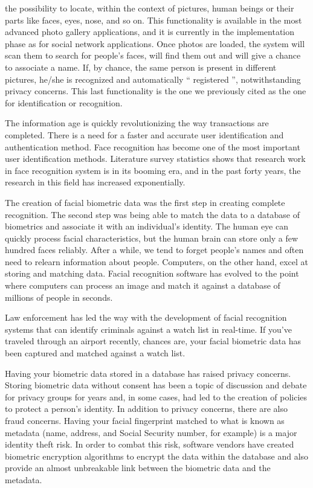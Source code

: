 \documentclass[sigconf]{acmart}
\begin{document}
the possibility to locate, within the context of pictures, human beings or their parts like faces, eyes, nose, and so on. This functionality is available in the most advanced photo gallery applications, and it is currently in the implementation phase as for social network applications. Once photos are loaded, the system will scan them to search for people’s faces, will find them out and will give a chance to associate a name. If, by chance, the same person is present in different pictures, he/she is recognized and automatically “ registered ”, notwithstanding privacy concerns. This last functionality is the one we previously cited as the one for identification or recognition.

The information age is quickly revolutionizing the way transactions are completed. There is a need for a faster and accurate user identification and authentication method. Face recognition has become one of the most important user identification methods. Literature survey statistics shows that research work in face recognition system is in its booming era, and in the past forty years, the research in this field has increased exponentially. ~\cite{arduino2015}

The creation of facial biometric data was the first step in creating complete recognition. The second step was being able to match the data to a database of biometrics and associate it with an individual’s identity. The human eye can quickly process facial characteristics, but the human brain can store only a few hundred faces reliably. After a while, we tend to forget people’s names and often need to relearn information about people. Computers, on the other hand, excel at storing and matching data. Facial recognition software has evolved to the point where computers can process an image and match it against a database of millions of people in seconds.

Law enforcement has led the way with the development of facial recognition systems that can identify criminals against a watch list in real-time. If you’ve traveled through an airport recently, chances are, your facial biometric data has been captured and matched against a watch list.

Having your biometric data stored in a database has raised privacy concerns. Storing biometric data without consent has been a topic of discussion and debate for privacy groups for years and, in some cases, had led to the creation of policies to protect a person’s identity. In addition to privacy concerns, there are also fraud concerns. Having your facial fingerprint matched to what is known as metadata (name, address, and Social Security number, for example) is a major identity theft risk. In order to combat this risk, software vendors have created biometric encryption algorithms to encrypt the data within the database and also provide an almost unbreakable link between the biometric data and the metadata.
\end{document}
